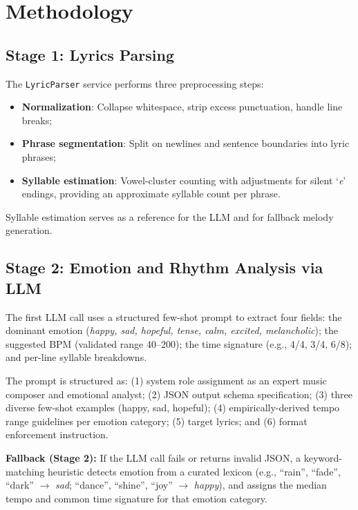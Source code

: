 \documentclass[conference]{IEEEtran}
\begin{document}
\section{Methodology}

\subsection{Stage 1: Lyrics Parsing}

The \texttt{LyricParser} service performs three preprocessing steps:
\begin{itemize}
  \item \textbf{Normalization}: Collapse whitespace, strip excess punctuation,
        handle line breaks;
  \item \textbf{Phrase segmentation}: Split on newlines and sentence boundaries
        into lyric phrases;
  \item \textbf{Syllable estimation}: Vowel-cluster counting with adjustments
        for silent `\textit{e}' endings, providing an approximate syllable count
        per phrase.
\end{itemize}
Syllable estimation serves as a reference for the LLM and for fallback melody
generation.

\subsection{Stage 2: Emotion and Rhythm Analysis via LLM}

The first LLM call uses a structured few-shot prompt to extract four fields:
the dominant emotion (\textit{happy, sad, hopeful, tense, calm, excited,
melancholic}); the suggested BPM (validated range 40--200); the time signature
(e.g., 4/4, 3/4, 6/8); and per-line syllable breakdowns.

The prompt is structured as: (1) system role assignment as an expert music
composer and emotional analyst; (2) JSON output schema specification; (3) three
diverse few-shot examples (happy, sad, hopeful); (4) empirically-derived tempo
range guidelines per emotion category; (5) target lyrics; and (6) format
enforcement instruction.

\textbf{Fallback (Stage 2):} If the LLM call fails or returns invalid JSON,
a keyword-matching heuristic detects emotion from a curated lexicon (e.g.,
``rain'', ``fade'', ``dark'' $\to$ \textit{sad}; ``dance'', ``shine'', ``joy''
$\to$ \textit{happy}), and assigns the median tempo and common time signature
for that emotion category.
\end{document}
